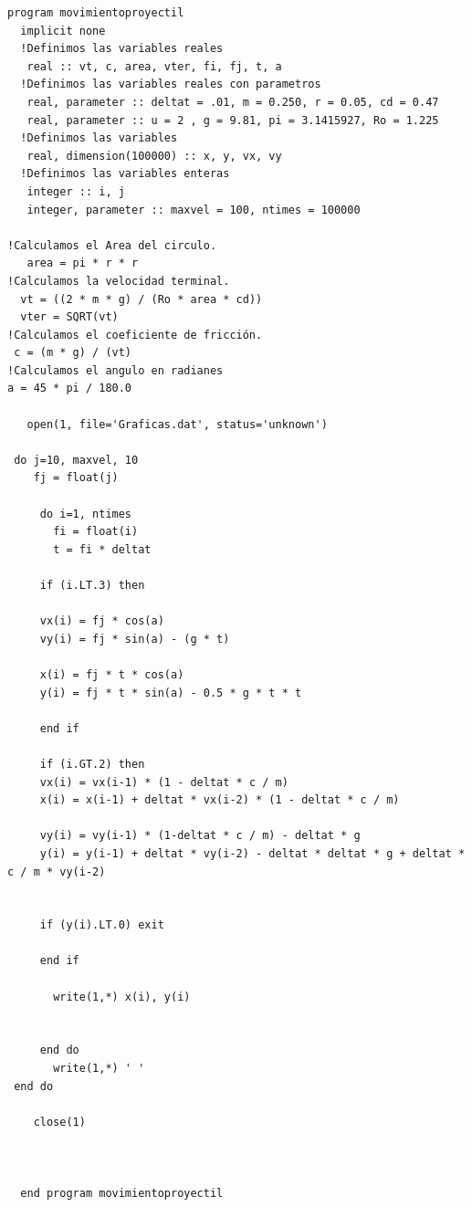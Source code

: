 \documentclass[12pt,a4paper,twoside]{article}
\begin{document}
\begin{verbatim}
program movimientoproyectil
  implicit none
  !Definimos las variables reales
   real :: vt, c, area, vter, fi, fj, t, a
  !Definimos las variables reales con parametros
   real, parameter :: deltat = .01, m = 0.250, r = 0.05, cd = 0.47
   real, parameter :: u = 2 , g = 9.81, pi = 3.1415927, Ro = 1.225
  !Definimos las variables 
   real, dimension(100000) :: x, y, vx, vy
  !Definimos las variables enteras
   integer :: i, j
   integer, parameter :: maxvel = 100, ntimes = 100000
   
!Calculamos el Area del circulo.
   area = pi * r * r
!Calculamos la velocidad terminal.
  vt = ((2 * m * g) / (Ro * area * cd))
  vter = SQRT(vt)
!Calculamos el coeficiente de fricción.
 c = (m * g) / (vt)
!Calculamos el angulo en radianes
a = 45 * pi / 180.0

   open(1, file='Graficas.dat', status='unknown')

 do j=10, maxvel, 10
    fj = float(j)
    
     do i=1, ntimes
       fi = float(i)
       t = fi * deltat
       
     if (i.LT.3) then
     
     vx(i) = fj * cos(a)
     vy(i) = fj * sin(a) - (g * t)

     x(i) = fj * t * cos(a)
     y(i) = fj * t * sin(a) - 0.5 * g * t * t

     end if

     if (i.GT.2) then
     vx(i) = vx(i-1) * (1 - deltat * c / m)
     x(i) = x(i-1) + deltat * vx(i-2) * (1 - deltat * c / m)

     vy(i) = vy(i-1) * (1-deltat * c / m) - deltat * g
     y(i) = y(i-1) + deltat * vy(i-2) - deltat * deltat * g + deltat * c / m * vy(i-2)
     

     if (y(i).LT.0) exit
     
     end if
     
       write(1,*) x(i), y(i)
       
    
     end do
       write(1,*) ' '
 end do
     
    close(1)
    
 

  end program movimientoproyectil
\end{verbatim}
\end{document}
